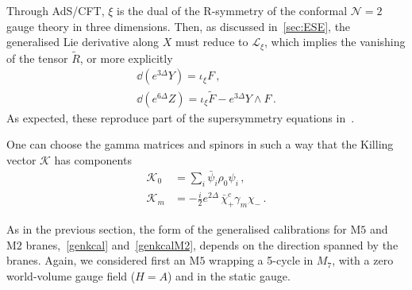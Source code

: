 \documentclass[debug]{phd}
\begin{document}
Through AdS/CFT, $\xi$ is the dual of the R-symmetry of the conformal $\mathcal{N}=2$ gauge theory in three dimensions. 
Then, as discussed in~\cref{sec:ESE}, the generalised Lie derivative along $X$ must reduce to $\mathcal{L}_\xi$, which implies the vanishing of the tensor $\tilde{R}$, or more explicitly
		\begin{equation}
		\label{M7Rvan}
			\begin{array}{l}
				\dd  (e^{3\Delta}Y)=\iota_{\xi} F\, , \\
				\dd  (e^{6\Delta}Z)= \iota_{\xi} \tilde{F} -e^{3\Delta} Y \wedge F\, .
			\end{array}
		\end{equation}
As expected, these reproduce part of the supersymmetry equations in~\cite{Gabella:2012rc}.	
	
%

One can choose the gamma matrices and spinors in such a way that the Killing vector $\mathcal{K}$ has components~\cite{Gabella:2012rc} 
%
	\begin{equation}
		\begin{split}
			\mathcal{K}_0 & = \sum_i \bar{\psi}_i\rho_0 \psi_i\, , \\
			\mathcal{K}_m & = - \tfrac{i}{2} e^{2\Delta}\, \bar{\chi}^c_+ \gamma_m \chi_- \, .
		\end{split}
	\end{equation}
%


As in the previous section, the form of the generalised calibrations for $\mathrm{M}5$ and $\mathrm{M}2$ branes,~\eqref{genkcal} and~\eqref{genkcalM2}, depends on the direction spanned by the branes. 
Again, we considered first an $\mathrm{M}5$ wrapping a 5-cycle in $M_7$, with a zero world-volume gauge field ($H = A$) and in the static gauge. 
\end{document}

